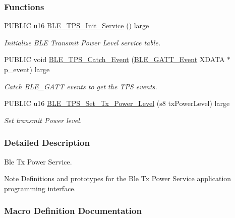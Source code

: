 \subsubsection*{Functions}
\begin{DoxyCompactItemize}
\item 
P\+U\+B\+L\+IC u16 \hyperlink{group___b_l_e___t_p_s_ga269ad4614ff6f8a7b176653974416821}{B\+L\+E\+\_\+\+T\+P\+S\+\_\+\+Init\+\_\+\+Service} () large
\begin{DoxyCompactList}\small\item\em Initialize B\+LE Transmit Power Level service table. \end{DoxyCompactList}\item 
P\+U\+B\+L\+IC void \hyperlink{group___b_l_e___t_p_s_gafedbd824a2480e45473db451c47e3d56}{B\+L\+E\+\_\+\+T\+P\+S\+\_\+\+Catch\+\_\+\+Event} (\hyperlink{struct_b_l_e___g_a_t_t___event}{B\+L\+E\+\_\+\+G\+A\+T\+T\+\_\+\+Event} X\+D\+A\+TA $\ast$p\+\_\+event) large
\begin{DoxyCompactList}\small\item\em Catch B\+L\+E\+\_\+\+G\+A\+TT events to get the T\+PS events. \end{DoxyCompactList}\item 
P\+U\+B\+L\+IC u16 \hyperlink{group___b_l_e___t_p_s_ga84165d1f804b88781fbd7cd54405db23}{B\+L\+E\+\_\+\+T\+P\+S\+\_\+\+Set\+\_\+\+Tx\+\_\+\+Power\+\_\+\+Level} (s8 tx\+Power\+Level) large
\begin{DoxyCompactList}\small\item\em Set transmit Power level. \end{DoxyCompactList}\end{DoxyCompactItemize}


\subsubsection{Detailed Description}
Ble Tx Power Service. 

\begin{DoxyNote}{Note}
Definitions and prototypes for the Ble Tx Power Service application programming interface. 
\end{DoxyNote}


\subsubsection{Macro Definition Documentation}

